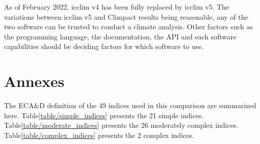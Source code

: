 \documentclass[a4paper,11pt]{article}
\begin{document}
    As of February 2022, icclim v4 has been fully replaced by icclim v5.
    The variations between icclim v5 and Climpact results being reasonable, any of the two software can be trusted to conduct a climate analysis.
    Other factors such as the programming language, the documentation, the API and each software capabilities should be deciding factors for which software to use. 


\part{Annexes}
\label{part/annexes}

    The ECA\&D definition of the 49 indices used in this comparison are summarized here.
    Table\ref{table/simple_indices} presents the 21 simple indices.
    Table\ref{table/moderate_indices} presents the 26 moderately complex indices.
    Table\ref{table/complex_indices} presents the 2 complex indices.
\end{document}
